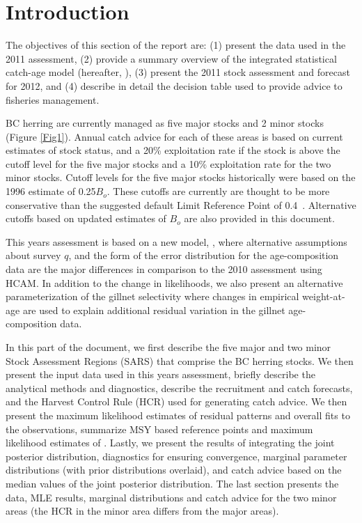 

\section{Introduction}

The objectives of this section of the report are: (1) present the data used in the 2011 assessment, (2) provide a summary overview of the integrated statistical catch-age model (hereafter, \iscam), (3) present the 2011 stock assessment and forecast for 2012, and (4) describe in detail the decision table used to provide advice to fisheries management.

BC herring are currently managed as five major stocks and 2 minor stocks (Figure \ref{Fig1}).  Annual catch advice for each of these areas is based on current estimates of stock status, and a 20\% exploitation rate if the stock is above the cutoff level for the five major stocks and a 10\% exploitation rate for the two minor stocks.  Cutoff levels for the five major stocks historically were based on the 1996 estimate of  0.25$B_o$.  These cutoffs are currently are thought to be more conservative 	than the suggested default Limit Reference Point of 0.4\bmsy\ \citep{dfo2006}.  Alternative cutoffs based on updated estimates of $B_o$ are also provided in this document.

This years assessment is based on a new model, \iscam, where alternative assumptions about survey $q$, and the form of the error distribution for the age-composition data are the major differences in comparison to the 2010 assessment using HCAM.  In addition to the change in likelihoods, we also present an alternative parameterization of the gillnet selectivity where changes in empirical weight-at-age are used to explain additional residual variation in the gillnet age-composition data. 

In this part of the document, we first describe the five major and two minor Stock Assessment Regions (SARS) that comprise the BC herring stocks. We then present the input data used in this years assessment, briefly describe the analytical methods and diagnostics, describe the recruitment and catch forecasts, and the Harvest Control Rule (HCR) used for generating catch advice. We then present the maximum likelihood estimates of residual patterns and overall fits to the observations, summarize MSY based reference points and maximum likelihood estimates of \bo. Lastly, we present the results of integrating the joint posterior distribution, diagnostics for ensuring convergence, marginal parameter distributions (with prior distributions overlaid), and catch advice based on the median values of the joint posterior distribution.  The last section presents the data, MLE results, marginal distributions and catch advice for the two minor areas (the HCR in the minor area differs from the major areas).


